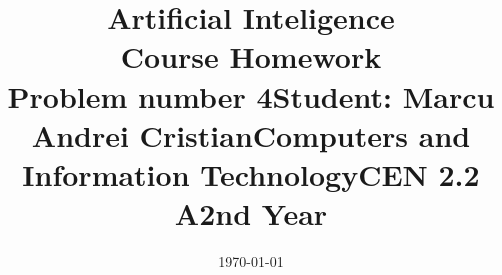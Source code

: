 \documentclass[14pt]{article}
\begin{document}
\title{%
  \huge Artificial Inteligence \\
  \vspace{20mm}
  \large Course Homework \\
    Problem number 4}

\date{\today}
\maketitle
\begin{center}
\vspace{30 mm}

\title{\huge Student: Marcu Andrei Cristian}
\\\vspace{10 mm}
\title{\huge Computers and Information Technology}
\\\vspace{10 mm}
\title{\huge CEN 2.2 A}
\\\vspace{10 mm}
\title{\huge 2nd Year}
\date{}
\maketitle

\newpage

\end{center}
\end{document}
